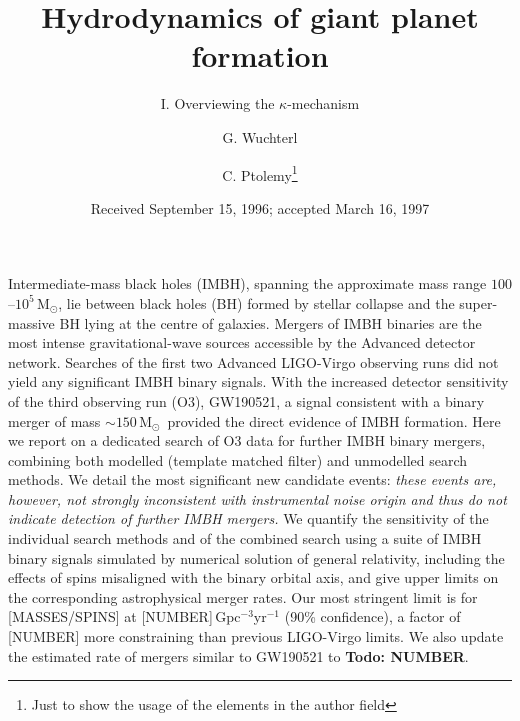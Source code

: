 \documentclass{aa}
\newcommand{\Msun}{\ensuremath{\mathrm{M}_\odot}}
\newcommand{\rough}[1]{\textit{\color{brown} #1}}
\newcommand{\todo}[1]{\textbf{\color{red} Todo: #1}}
\begin{document}
 


   \title{Hydrodynamics of giant planet formation}

   \subtitle{I. Overviewing the $\kappa$-mechanism}

   \author{G. Wuchterl
          \and
          C. Ptolemy\fnmsep\thanks{Just to show the usage
          of the elements in the author field}
          }


   \date{Received September 15, 1996; accepted March 16, 1997}

 
  \abstract
{Intermediate-mass black holes (IMBH), spanning the approximate mass range 
$100$--$10^5$\,\Msun, lie between black holes (BH) formed by stellar collapse
and the super-massive BH lying at the centre of galaxies.  Mergers of IMBH binaries are 
the most intense gravitational-wave sources accessible by the Advanced detector network. 
Searches of the first two Advanced LIGO-Virgo observing runs did not yield any 
significant IMBH binary signals.  With the increased detector sensitivity of the third
observing run (O3), GW190521, a signal consistent with a binary merger of mass $\sim 150$\,\Msun\, 
provided the direct evidence of IMBH formation.  Here 
we report on a dedicated search of O3 data
for further IMBH binary mergers, combining both modelled (template matched filter) and 
unmodelled search methods. 
We detail the most significant new candidate events: %
\rough{these events are, however, not strongly inconsistent with instrumental noise origin
and thus do not indicate detection of further IMBH mergers.} 
We quantify the sensitivity of the individual search methods and of the combined search
using a suite of IMBH binary signals simulated by numerical solution of general relativity, 
including the effects of spins misaligned with the binary orbital axis, and give upper 
limits on the corresponding astrophysical merger rates.  Our most stringent limit is for 
[MASSES/SPINS] at [NUMBER]\,Gpc$^{-3}$yr$^{-1}$ (90\% confidence), a factor of [NUMBER] 
more constraining than previous LIGO-Virgo limits.  We also update the estimated rate of
mergers similar to GW190521 to \todo{NUMBER}.}
\end{document}
